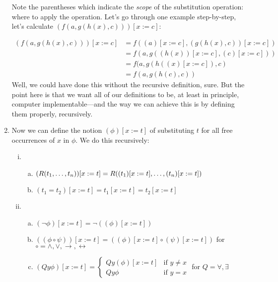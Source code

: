 \begin{enumerate}[\thesection.1]
\begin{enumerate}[(i)]
			\end{enumerate} 
			
	Note the parentheses which indicate the \emph{scope} of the substitution operation: where to apply the operation. Let's go through one example step-by-step, let's calculate $(f(a, g(h(x),c)))[x:=c]$:
	
	\begin{align*}
	(f(a, g(h(x),c)))[x:=c]&=f((a)[x:=c], (g(h(x),c))[x:=c])\\
	&=f(a, g((h(x))[x:=c], (c)[x:=c]))\\
	&=f(a,g(h((x)[x:=c]), c)\\
	&=f(a,g(h(c),c))
	\end{align*}
Well, we could have done this without the recursive definition, sure. But the point here is that we want all of our definitions to be, at least in principle, computer implementable---and the way we can achieve this is by defining them properly, recursively.

	\item	Now we can define the notion $(\phi)[x:=t]$ of substituting $t$ for all free occurrences of $x$ in $\phi$. We do this recursively:	
		\begin{enumerate}[(i)]
	
			\item \begin{enumerate}[(a)] 
			
				\item $(R(t_1, \mathellipsis, t_n))[x:=t]=R((t_1)[x:=t], \mathellipsis, (t_n)[x:=t])$
				
				\item $(t_1=t_2)[x:=t]=t_1[x:=t]=t_2[x:=t]$
				
			\end{enumerate}
			
			\item \begin{enumerate}[(a)] 

			\item $(\neg\phi)[x:=t]=\neg((\phi)[x:=t])$

			
			\item $((\phi\circ\psi))[x:=t]=((\phi)[x:=t]\circ(\psi)[x:=t])$ for $\circ=\land,\lor,\to,\leftrightarrow$
			
			\item $(Qy\phi)[x:=t]=\begin{cases} Qy(\phi)[x:=t] & \text{if } y\neq x\\ Qy\phi & \text{if }y=x\end{cases}$ for $Q=\forall,\exists$


\end{enumerate}
\end{enumerate}
\end{enumerate}
